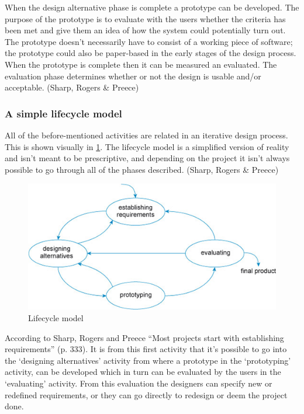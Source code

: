 When the design alternative phase is complete a prototype can be developed. The purpose of the prototype is to evaluate with the users whether the criteria has been met and give them an idea of how the system could potentially turn out. The prototype doesn’t necessarily have to consist of a working piece of software; the prototype could also be paper-based in the early stages of the design process. When the prototype is complete then it can be measured an evaluated. The evaluation phase determines whether or not the design is usable and/or acceptable. (Sharp, Rogers \& Preece)

\subsubsection{A simple lifecycle model}
All of the before-mentioned activities are related in an iterative design process. This is shown visually in \cref{fig:LifecycleModel}. The lifecycle model is a simplified version of reality and isn’t meant to be prescriptive, and depending on the project it isn’t always possible to go through all of the phases described. (Sharp, Rogers \& Preece)

\begin{figure}[h]
	\includegraphics[width=1\textwidth]{billeder/lifecycle.png}
	\caption{Lifecycle model}\label{fig:LifecycleModel}
\end{figure}

According to Sharp, Rogers and Preece “Most projects start with establishing requirements” (p. 333). It is from this first activity that it’s possible to go into the ‘designing alternatives’ activity from where a prototype in the ‘prototyping’ activity, can be developed which in turn can be evaluated by the users in the ‘evaluating’ activity. From this evaluation the designers can specify new or redefined requirements, or they can go directly to redesign or deem the project done.
